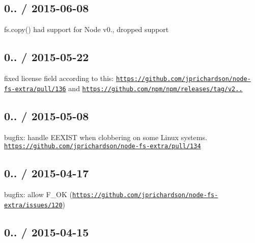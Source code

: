 \subsection*{0.. / 2015-\/06-\/08 }


\begin{DoxyItemize}
\item {\ttfamily fs.\+copy()} had support for Node v0., dropped support
\end{DoxyItemize}

\subsection*{0.. / 2015-\/05-\/22 }


\begin{DoxyItemize}
\item fixed license field according to this\+: \href{https://github.com/jprichardson/node-fs-extra/pull/136}{\tt https\+://github.\+com/jprichardson/node-\/fs-\/extra/pull/136} and \href{https://github.com/npm/npm/releases/tag/v2.10.0}{\tt https\+://github.\+com/npm/npm/releases/tag/v2..}
\end{DoxyItemize}

\subsection*{0.. / 2015-\/05-\/08 }


\begin{DoxyItemize}
\item bugfix\+: handle {\ttfamily E\+E\+X\+I\+S\+T} when clobbering on some Linux systems. \href{https://github.com/jprichardson/node-fs-extra/pull/134}{\tt https\+://github.\+com/jprichardson/node-\/fs-\/extra/pull/134}
\end{DoxyItemize}

\subsection*{0.. / 2015-\/04-\/17 }


\begin{DoxyItemize}
\item bugfix\+: allow {\ttfamily F\+\_\+\+O\+K} (\href{https://github.com/jprichardson/node-fs-extra/issues/120}{\tt https\+://github.\+com/jprichardson/node-\/fs-\/extra/issues/120})
\end{DoxyItemize}

\subsection*{0.. / 2015-\/04-\/15 }


